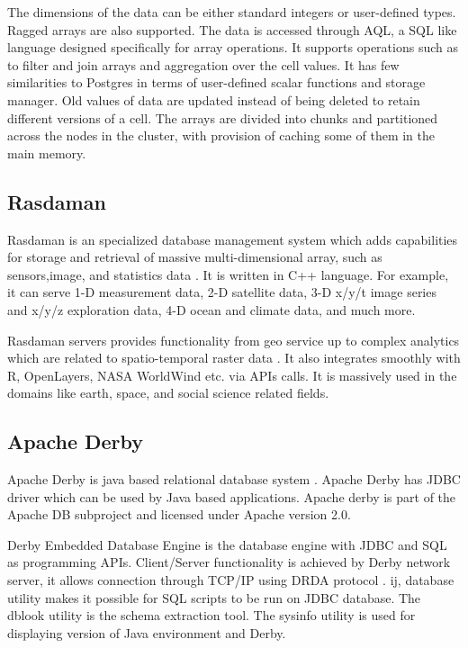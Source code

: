      The dimensions of the data can be either standard integers or user-defined
     types. Ragged arrays are also supported. The data is accessed through AQL,
     a SQL like language designed specifically for array operations. It
     supports operations such as to filter and join arrays and aggregation over
     the cell values. It has few similarities to Postgres in terms of
     user-defined scalar functions and storage manager. Old values of data are
     updated instead of being deleted to retain different versions of a cell.
     The arrays are divided into chunks and partitioned across the nodes in the
     cluster, with provision of caching some of them in the main memory.

     \pv

\subsection{Rasdaman}

     Rasdaman is an specialized database management system which adds
     capabilities for storage and retrieval of massive
     multi-dimensional array, such as sensors,image, and statistics
     data \cite{www-rasdaman-wiki}. It is written in C++
     language. For example, it can serve 1-D measurement data, 2-D
     satellite data, 3-D x/y/t image series and x/y/z exploration
     data, 4-D ocean and climate data, and much more.

     Rasdaman servers provides
     functionality from geo service up to complex analytics which are
     related to spatio-temporal raster data \cite{www-rasdaman-official}.
     It also integrates
     smoothly with R, OpenLayers, NASA WorldWind etc. via APIs
     calls. It is massively used in the domains like earth, space,
     and social science related fields.

     \pv
     
\subsection{Apache Derby}

     Apache Derby is java based relational
     database system \cite{www-apachederby}. Apache Derby has
     JDBC driver which can be used
     by Java based applications. Apache derby is part of the Apache DB
     subproject and licensed under Apache version 2.0.

     Derby Embedded Database Engine is
     the database engine with JDBC and SQL as programming APIs.
     Client/Server functionality is achieved by Derby network server,
     it allows connection through TCP/IP
     using DRDA protocol \cite{www-apachederbycharter}. ij,
     database utility makes it possible for SQL scripts to be run on
     JDBC database. The dblook utility is the schema extraction
     tool. The sysinfo utility is used for displaying version of Java
     environment and Derby.

